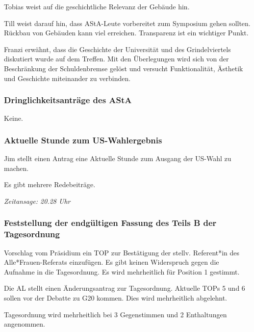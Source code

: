 \documentclass[ngerman,headheight=70pt]{scrartcl}
\begin{document}
    Tobias weist auf die geschichtliche Relevanz der Gebäude hin.

    Till weist darauf hin, dass AStA-Leute vorbereitet zum Symposium gehen sollten.
    Rückbau von Gebäuden kann viel erreichen. Transparenz ist ein wichtiger Punkt.

    Franzi erwähnt, dass die Geschichte der Universität und des Grindelviertels
    diskutiert wurde auf dem Treffen. Mit den Überlegungen wird sich von der
    Beschränkung der Schuldenbremse gelöst und versucht Funktionalität, Ästhetik
    und Geschichte miteinander zu verbinden.

    \subsubsection{Dringlichkeitsanträge des AStA}

    Keine.

    \subsubsection{Aktuelle Stunde zum US-Wahlergebnis}

    Jim stellt einen Antrag eine Aktuelle Stunde zum Ausgang der US-Wahl zu machen.

    Es gibt mehrere Redebeiträge.

    \textit{Zeitansage: 20.28 Uhr}

    \subsubsection{Feststellung der endgültigen Fassung des Teils B der Tagesordnung}

    Vorschlag vom Präsidium ein TOP zur Bestätigung der stellv. Referent*in des
    Alle*Frauen-Referats einzufügen.
    Es gibt keinen Widerspruch gegen die Aufnahme in die Tagesordnung.
    Es wird mehrheitlich für Position 1 gestimmt.

    Die AL stellt einen Änderungsantrag zur Tagesordnung. Aktuelle TOPs 5 und 6
    sollen vor der Debatte zu G20 kommen. Dies wird mehrheitlich abgelehnt.

    Tagesordnung wird mehrheitlich bei 3 Gegenstimmen und 2 Enthaltungen angenommen.
\end{document}
